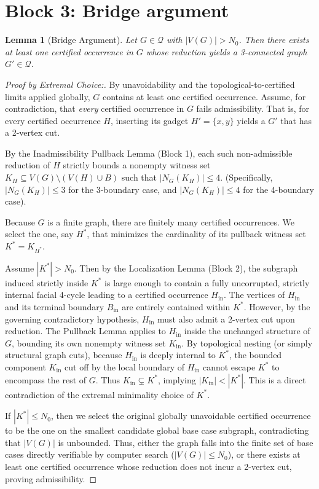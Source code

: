 \documentclass[12pt]{article}
\newtheorem{lemma}[theorem]{Lemma}
\begin{document}
\section*{Block 3: Bridge argument}

\begin{lemma}[Bridge Argument]
Let $G \in \mathcal{Q}$ with $|V(G)| > N_0$. Then there exists at least one certified occurrence in $G$ whose reduction yields a 3-connected graph $G' \in \mathcal{Q}$.
\end{lemma}

\begin{proof}[Proof by Extremal Choice:]
By unavoidability and the topological-to-certified limits applied globally, $G$ contains at least one certified occurrence.
Assume, for contradiction, that \emph{every} certified occurrence in $G$ fails admissibility. That is, for every certified occurrence $H$, inserting its gadget $H'=\{x,y\}$ yields a $G'$ that has a 2-vertex cut.

By the Inadmissibility Pullback Lemma (Block 1), each such non-admissible reduction of $H$ strictly bounds a nonempty witness set $K_H \subseteq V(G) \setminus (V(H) \cup B)$ such that $|N_G(K_H)| \le 4$.
(Specifically, $|N_G(K_H)| \le 3$ for the 3-boundary case, and $|N_G(K_H)| \le 4$ for the 4-boundary case).

Because $G$ is a finite graph, there are finitely many certified occurrences. We select the one, say $H^*$, that minimizes the cardinality of its pullback witness set $K^* = K_{H^*}$.

Assume $|K^*| > N_0$. Then by the Localization Lemma (Block 2), the subgraph induced strictly inside $K^*$ is large enough to contain a fully uncorrupted, strictly internal facial 4-cycle leading to a certified occurrence $H_{\mathrm{in}}$. The vertices of $H_{\mathrm{in}}$ and its terminal boundary $B_{\mathrm{in}}$ are entirely contained within $K^*$.
However, by the governing contradictory hypothesis, $H_{\mathrm{in}}$ must also admit a 2-vertex cut upon reduction. The Pullback Lemma applies to $H_{\mathrm{in}}$ inside the unchanged structure of $G$, bounding its own nonempty witness set $K_{\mathrm{in}}$.
By topological nesting (or simply structural graph cuts), because $H_{\mathrm{in}}$ is deeply internal to $K^*$, the bounded component $K_{\mathrm{in}}$ cut off by the local boundary of $H_{\mathrm{in}}$ cannot escape $K^*$ to encompass the rest of $G$. Thus $K_{\mathrm{in}} \subsetneq K^*$, implying $|K_{\mathrm{in}}| < |K^*|$.
This is a direct contradiction of the extremal minimality choice of $K^*$.

If $|K^*| \le N_0$, then we select the original globally unavoidable certified occurrence to be the one on the smallest candidate global base case subgraph, contradicting that $|V(G)|$ is unbounded. Thus, either the graph falls into the finite set of base cases directly verifiable by computer search ($|V(G)| \le N_0$), or there exists at least one certified occurrence whose reduction does not incur a 2-vertex cut, proving admissibility.
\end{proof}
\end{document}
